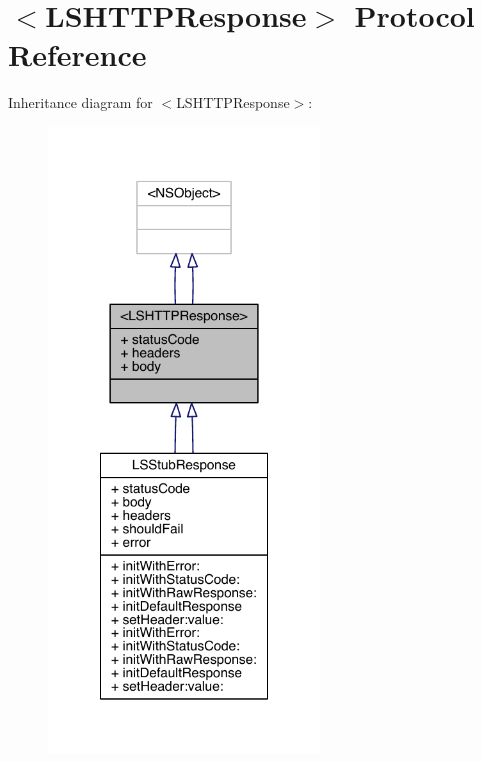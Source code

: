 \hypertarget{protocol_l_s_h_t_t_p_response-p}{\section{$<$L\-S\-H\-T\-T\-P\-Response$>$ Protocol Reference}
\label{protocol_l_s_h_t_t_p_response-p}
}


Inheritance diagram for $<$L\-S\-H\-T\-T\-P\-Response$>$\-:\nopagebreak
\begin{figure}[H]
\begin{center}
\leavevmode
\includegraphics[width=204pt]{protocol_l_s_h_t_t_p_response-p__inherit__graph}
\end{center}
\end{figure}


